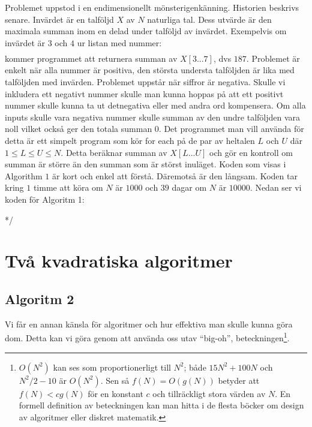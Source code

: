 \documentclass[a4paper,12pt]{article}
\begin{document}
Problemet uppstod i en endimensionellt mönsterigenkänning. Historien beskrivs
senare. Invärdet är en talföljd $X$ av $N$ naturliga tal. Dess utvärde är den
maximala
summan inom en delad under talföljd av invärdet. Exempelvis om invärdet är $3$
och
$4$ ur listan med nummer:
%
\begin{align*}
  [31, -41, 59, 26, -53, 58, 97, -93, -23, 84]
\end{align*}
%
kommer programmet att returnera summan av $X[3...7]$, dvs $187$. Problemet är
enkelt
när alla nummer är positiva, den största understa talföljden är lika med
talföljden
med invärden.
Problemet uppstår när siffror är negativa. Skulle vi inkludera ett negativt
nummer skulle man kunna hoppas på att ett positivt nummer skulle kunna ta ut
detnegativa eller med andra ord kompensera. Om alla inputs skulle vara negativa
nummer skulle summan av den undre talföljden vara noll vilket också ger den
totala
summan $0$.
%
Det programmet man vill använda för detta är ett simpelt program som kör for
each på  de par av heltalen $L$ och $U$ där $1 \leq L \leq U \leq N$. Detta
beräknar summan
av $X[L...U]$ och gör en kontroll om summan är större än den summan som är
störst
inuläget. Koden som visas i Algorithm $1$ är kort och enkel att förstå.
Däremotså
är den långsam. Koden tar kring $1$ timme att köra om $N$ är $1000$ och $39$
dagar om $N$ är $10000$. Nedan ser vi koden för Algoritm 1:
%
\begin{center}
%
\begin{algorithmic}
\newpage
{}
  	 \ENDFOR
  	  */
 	 \ENDFOR
 \ENDFOR
\end{algorithmic}
%
\end{center}
%


\section{Två kvadratiska algoritmer}
\label{sec:uppgN}


\subsection{Algoritm 2}


Vi får en annan känsla för algoritmer och hur effektiva man skulle kunna göra
dom. Detta kan vi göra genom att använda oss utav “big-oh”,
beteckningen\footnote{$O(N^2)$ kan ses som proportionerligt till $N^2$; både
$15N^2 + 100N$ och $N^2/2 -10$ är $O(N^2)$. Sen så $f(N) = O(g(N))$ betyder att
$f(N) < cg(N)$ för en konstant $c$ och tillräckligt stora värden av $N$. En
formell
definition av beteckningen kan man hitta i de flesta böcker om design av
algoritmer eller diskret matematik. }.
%
\end{document}
